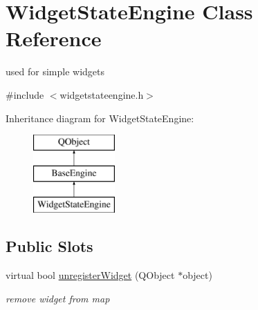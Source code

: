 \hypertarget{class_widget_state_engine}{}\section{Widget\+State\+Engine Class Reference}
\label{class_widget_state_engine}


used for simple widgets  




{\ttfamily \#include $<$widgetstateengine.\+h$>$}

Inheritance diagram for Widget\+State\+Engine\+:\begin{figure}[H]
\begin{center}
\leavevmode
\includegraphics[height=3.000000cm]{class_widget_state_engine}
\end{center}
\end{figure}
\subsection*{Public Slots}
\begin{DoxyCompactItemize}
\item 
\mbox{\label{class_widget_state_engine_a86236653460a858c7ca8107edf2a0e63}} 
virtual bool \hyperlink{class_widget_state_engine_a86236653460a858c7ca8107edf2a0e63}{unregister\+Widget} (Q\+Object $\ast$object)
\begin{DoxyCompactList}\small\item\em remove widget from map \end{DoxyCompactList}\end{DoxyCompactItemize}
